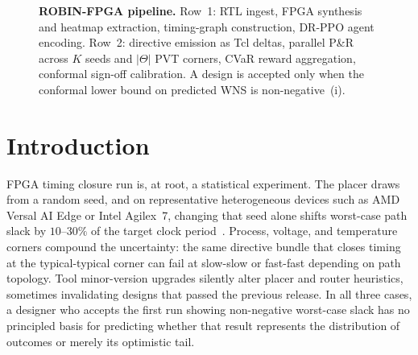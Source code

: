 \documentclass[journal]{IEEEtran}
\begin{document}
\begin{figure}[t]
\caption{\textbf{ROBIN-FPGA pipeline.} Row~1: RTL ingest, FPGA synthesis and heatmap extraction, timing-graph construction, DR-PPO agent encoding. Row~2: directive emission as Tcl deltas, parallel P\&R across $K$ seeds and $|\Theta|$ PVT corners, CVaR reward aggregation, conformal sign-off calibration. A design is accepted only when the conformal lower bound on predicted WNS is non-negative~(i).}
\label{fig:cover}
\end{figure}

\section{Introduction}
 FPGA timing closure run is, at root, a statistical experiment. The placer draws from a random seed, and on representative heterogeneous devices such as AMD Versal AI Edge or Intel Agilex~7, changing that seed alone shifts worst-case path slack by $10$--$30\%$ of the target clock period~\cite{amd_ug1273,intel_ug20156}. Process, voltage, and temperature corners compound the uncertainty: the same directive bundle that closes timing at the typical-typical corner can fail at slow-slow or fast-fast depending on path topology. Tool minor-version upgrades silently alter placer and router heuristics, sometimes invalidating designs that passed the previous release. In all three cases, a designer who accepts the first run showing non-negative worst-case slack has no principled basis for predicting whether that result represents the distribution of outcomes or merely its optimistic tail.
\end{document}

